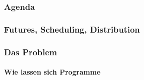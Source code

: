 \documentclass{beamer}
\begin{document}
\frame{\titlepage}

\begin{frame}
\frametitle{Agenda}
\tableofcontents[currentsection]
\end{frame}


\begin{frame}

\frametitle{Futures, Scheduling, Distribution}

\end{frame}


\begin{frame}

\frametitle{Das Problem}
\framesubtitle{Wie lassen sich Programme }

\end{frame}
\end{document}
